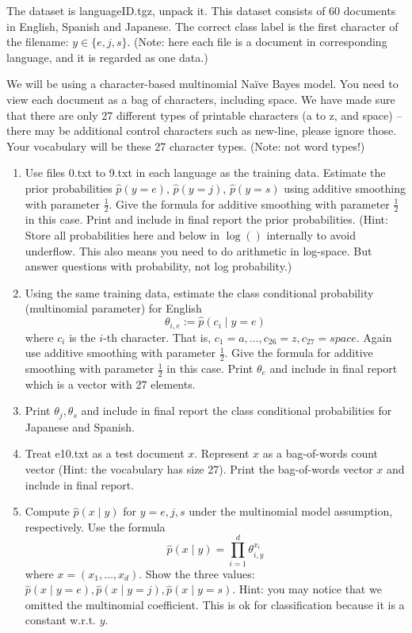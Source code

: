 \documentclass[letter]{article}
\theoremstyle{definition}
\begin{document}
The dataset is languageID.tgz, unpack it.
This dataset consists of 60 documents in English, Spanish and Japanese. 
The correct class label is the first character of the filename: $y \in \{e, j, s\}$. (Note: here each file is a document in corresponding language, and it is regarded as one data.)

We will be using a character-based multinomial Naïve Bayes model.  You need to view each document as a bag of characters, including space.  We have made sure that there are only 27 different types of printable characters (a to z, and space) -- there may be additional control characters such as new-line, please ignore those.  Your vocabulary will be these 27 character types. (Note: not word types!)


\begin{enumerate}
\item
Use files 0.txt to 9.txt in each language as the training data.
Estimate the prior probabilities 
$\hat p(y=e)$,
$\hat p(y=j)$,
$\hat p(y=s)$
using additive smoothing with parameter $\frac{1}{2}$. 
Give the formula for additive smoothing with parameter $\frac{1}{2}$ in this case. 
Print and include in final report the prior probabilities.
(Hint: Store all probabilities here and below in $\log()$ internally to avoid underflow. This also means you need to do arithmetic in log-space.  But answer questions with probability, not log probability.)


\item
Using the same training data, estimate the class conditional probability (multinomial parameter) for English
$$\theta_{i,e} := \hat p(c_i \mid y=e)$$ 
where $c_i$ is the $i$-th character. That is, $c_1 = a, \ldots, c_{26} = z, c_{27} = space$.
Again use additive smoothing with parameter $\frac{1}{2}$.
Give the formula for additive smoothing with parameter $\frac{1}{2}$ in this case. 
Print $\theta_e$ and include in final report which is a vector with 27 elements.


\item
Print $\theta_j, \theta_s$ and include in final report the class conditional probabilities for Japanese and Spanish.

\item
Treat e10.txt as a test document $x$.
Represent $x$ as a bag-of-words count vector (Hint: the vocabulary has size 27).
Print the bag-of-words vector $x$ and include in final report.

\item
Compute $\hat p(x \mid y)$ for $y=e, j, s$ under the multinomial model assumption, respectively.
Use the formula
$$\hat p(x \mid y) = \prod_{i=1}^d \theta_{i, y}^{x_i}$$
where $x=(x_1, \ldots, x_d)$.
Show the three values: $\hat p(x \mid y=e), \hat p(x \mid y=j), \hat p(x \mid y=s)$.
Hint: you may notice that we omitted the multinomial coefficient.  This is ok for classification because it is a constant w.r.t. $y$.



\end{enumerate}
\end{document}
